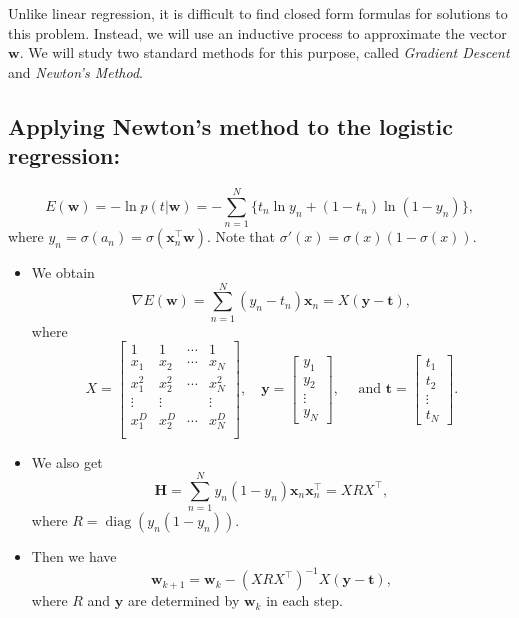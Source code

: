 \documentclass[
]{article}
\begin{document}
Unlike linear regression, it is difficult to find closed form formulas
for solutions to this problem. Instead, we will use an inductive process
to approximate the vector \({\boldsymbol{w}}\). We will study two
standard methods for this purpose, called \emph{Gradient Descent} and
\emph{Newton's Method}.

\hypertarget{applying-newtons-method-to-the-logistic-regression}{%
\subsection{Applying Newton's method to the logistic
regression:}\label{applying-newtons-method-to-the-logistic-regression}}

\[ E ({\boldsymbol{w}}) = - \ln p(t|{\boldsymbol{w}}) = - \sum_{n=1}^N \{ t_n \ln y_n + (1-t_n) \ln (1-y_n)\},  \]
where
\(y_n=\sigma(a_n)=\sigma({\boldsymbol{x}}_n^\top {\boldsymbol{w}})\).
Note that \(\sigma'(x) =\sigma(x)(1-\sigma(x))\).

\begin{itemize}
\item
  We obtain
  \[ \nabla E({\boldsymbol{w}})= \sum_{n=1}^N (y_n-t_n){\boldsymbol{x}}_n = X ({\boldsymbol{y}}-\mathbf{t}), \]
  where
  \[ X=\begin{bmatrix} 1 &1 & \cdots &1 \\ x_1 & x_2 & \cdots &x_N \\ x_1^2 & x_2^2 & \cdots &x_N^2 \\ \vdots & \vdots & & \vdots \\ x_1^D & x_2^D & \cdots &x_N^D \\\end{bmatrix}, \quad {\boldsymbol{y}}=\begin{bmatrix} y_1 \\ y_2 \\ \vdots \\ y_N \end{bmatrix}, \quad \text{ and } \mathbf{t}= \begin{bmatrix} t_1 \\ t_2 \\ \vdots \\ t_N \end{bmatrix} . \]
\item
  We also get
  \[ \mathbf H = \sum_{n=1}^N y_n(1-y_n) {\boldsymbol{x}}_n {\boldsymbol{x}}_n^\top = X R X^\top, \]
  where \(R=\operatorname{diag}( y_n(1-y_n))\).
\item
  Then we have
  \[ \boxed{{\boldsymbol{w}}_{k+1} = {\boldsymbol{w}}_k - (X R X^\top)^{-1} X ({\boldsymbol{y}}-\mathbf{t}) },\]
  where \(R\) and \({\boldsymbol{y}}\) are determined by
  \({\boldsymbol{w}}_k\) in each step.
\end{itemize}
\end{document}
